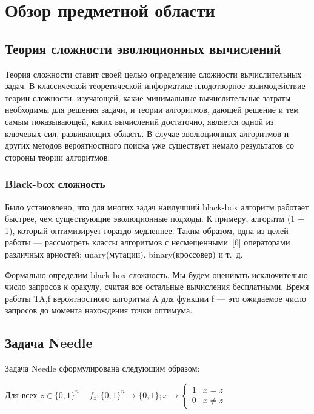 \chapter{Обзор предметной области}
\label{chapter1}

\section{Теория сложности эволюционных вычислений}
Теория сложности ставит своей целью определение сложности
вычислительных задач. В классической теоретической информатике
плодотворное взаимодействие теории сложности, изучающей, какие
минимальные вычислительные затраты необходимы для решения задачи,
и теории алгоритмов, дающей решение и тем самым показывающей, каких
вычислений достаточно, является одной из ключевых сил, развивающих
область.
В случае эволюционных алгоритмов и других методов вероятностного
поиска уже существует немало результатов со стороны теории алгоритмов. 
\subsection{Black-box сложность}

Было установлено, что для многих задач наилучший black-box алгоритм работает быстрее, чем существующие эволюционные подходы. К примеру, алгоритм (1 + 1), который оптимизирует гораздо медленнее. Таким образом, одна из целей работы — рассмотреть классы алгоритмов с несмещенными [6] операторами различных арностей: unary(мутации), binary(кроссовер) и т. д.

Формально определим black-box сложность. Мы будем
оценивать исключительно число запросов к оракулу, считая все остальные
вычисления бесплатными. Время работы TA,f вероятностного алгоритма A
для функции f — это ожидаемое число запросов до момента нахождения
точки оптимума.

\section{Задача Needle}

Задача Needle сформулирована следующим образом: 

Для всех $z \in \{0, 1\}^n \;\;\; $  
    \begin{math} 
    f_{z} : \{0, 1 \}^n \rightarrow \{0,1\}; x \rightarrow  \left\{ \begin{array}{ll}
    1 & \textrm{$x = z$}\\
    0 & \textrm{$x \ne z$}
    \end{array} \right.
    \end{math}

